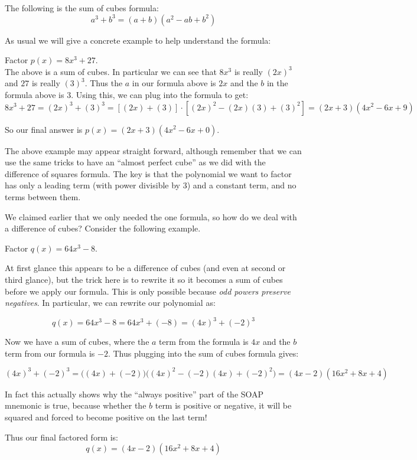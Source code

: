 \documentclass{ximera}
\begin{document}
    The following is the sum of cubes formula:
    \[
        a^3 + b^3 = (a + b)(a^2 - ab + b^2)
    \]
    
    As usual we will give a concrete example to help understand the formula: 
    
    \begin{example}
        Factor $p(x) = 8x^3 + 27$.\\
        
        The above is a sum of cubes. In particular we can see that $8x^3$ is really $(2x)^3$ and $27$ is really $(3)^3$. Thus the $a$ in our formula above is $2x$ and the $b$ in the formula above is $3$. Using this, we can plug into the formula to get:
        \[
            8x^3 + 27 = (2x)^3 + (3)^3 = [ (2x) + (3) ] \cdot [ (2x)^2 - (2x)(3) + (3)^2 ] = (2x + 3)(4x^2 - 6x + 9)
        \]
        
        So our final answer is $p(x) = (2x + 3)(4x^2 - 6x + 0)$.
        
    \end{example}
    
    The above example may appear straight forward, although remember that we can use the same tricks to have an ``almost perfect cube'' as we did with the difference of squares formula. The key is that the polynomial we want to factor has only a leading term (with power divisible by $3$) and a constant term, and no terms between them. 
    
    We claimed earlier that we only needed the one formula, so how do we deal with a difference of cubes? Consider the following example.
    
    \begin{example}
    Factor $q(x) = 64x^3 - 8$.
    
    At first glance this appears to be a difference of cubes (and even at second or third glance), but the trick here is to rewrite it so it becomes a sum of cubes before we apply our formula. This is only possible because \textit{odd powers preserve negatives}. In particular, we can rewrite our polynomial as:
    
    \[
        q(x) = 64x^3 - 8 = 64x^3 + (-8) = (4x)^3 + (-2)^3
    \]
    
    Now we have a sum of cubes, where the $a$ term from the formula is $4x$ and the $b$ term from our formula is $-2$. Thus plugging into the sum of cubes formula gives:
    
    \[
        (4x)^3 + (-2)^3 = \bigg((4x) + (-2)\bigg)\bigg((4x)^2 - (-2)(4x) + (-2)^2\bigg) = (4x-2)(16x^2 + 8x + 4)
    \]
    
    In fact this actually shows why the ``always positive'' part of the SOAP mnemonic is true, because whether the $b$ term is positive or negative, it will be squared and forced to become positive on the last term!
    
    Thus our final factored form is:
    \[
        q(x) = (4x-2)(16x^2 + 8x + 4)
    \]
    
    \end{example}
    
\end{document}
